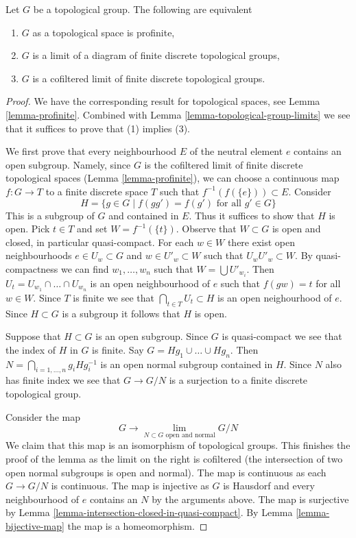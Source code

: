 \begin{lemma}
\label{lemma-profinite-group}
Let $G$ be a topological group. The following are equivalent
\begin{enumerate}
\item $G$ as a topological space is profinite,
\item $G$ is a limit of a diagram of finite discrete topological groups,
\item $G$ is a cofiltered limit of finite discrete topological groups.
\end{enumerate}
\end{lemma}

\begin{proof}
We have the corresponding result for topological spaces, see
Lemma \ref{lemma-profinite}. Combined with
Lemma \ref{lemma-topological-group-limits}
we see that it suffices to prove that (1) implies (3).

\medskip\noindent
We first prove that every neighbourhood $E$ of the neutral element $e$ contains
an open subgroup. Namely, since $G$ is the cofiltered limit of finite
discrete topological spaces (Lemma \ref{lemma-profinite}),
we can choose a continuous map $f : G \to T$ to a finite discrete
space $T$ such that $f^{-1}(f(\{e\})) \subset E$.
Consider
$$
H = \{g \in G \mid f(gg') = f(g')\text{ for all }g' \in G\}
$$
This is a subgroup of $G$ and contained in $E$. Thus it suffices to
show that $H$ is open. Pick $t \in T$ and set $W = f^{-1}(\{t\})$.
Observe that $W \subset G$ is open and closed, in particular quasi-compact.
For each $w \in W$ there exist open neighbourhoods $e \in U_w \subset G$
and $w \in U'_w \subset W$ such that $U_wU'_w \subset W$.
By quasi-compactness we can find $w_1, \ldots, w_n$ such that
$W = \bigcup U'_{w_i}$. Then
$U_t = U_{w_1} \cap \ldots \cap U_{w_n}$ is an open neighbourhood
of $e$ such that $f(gw) = t$ for all $w \in W$.
Since $T$ is finite we see that $\bigcap_{t \in T} U_t \subset H$
is an open neighourhood of $e$. Since $H \subset G$ is a subgroup
it follows that $H$ is open.

\medskip\noindent
Suppose that $H \subset G$ is an open subgroup. Since $G$ is quasi-compact
we see that the index of $H$ in $G$ is finite. Say
$G = Hg_1 \cup \ldots \cup Hg_n$. Then
$N = \bigcap_{i = 1, \ldots, n} g_iHg_i^{-1}$ is
an open normal subgroup contained in $H$. Since $N$ also has finite
index we see that $G \to G/N$ is a surjection to a finite discrete
topological group.

\medskip\noindent
Consider the map
$$
G \longrightarrow \lim_{N \subset G\text{ open and normal}} G/N
$$
We claim that this map is an isomorphism of topological groups.
This finishes the proof of the lemma as the limit on the right
is cofiltered (the intersection of two open normal subgroups is
open and normal). The map is continuous as each $G \to G/N$ is continuous.
The map is injective as $G$ is Hausdorf and every neighbourhood
of $e$ contains an $N$ by the arguments above.
The map is surjective by
Lemma \ref{lemma-intersection-closed-in-quasi-compact}.
By Lemma \ref{lemma-bijective-map} the map is a homeomorphism.
\end{proof}

